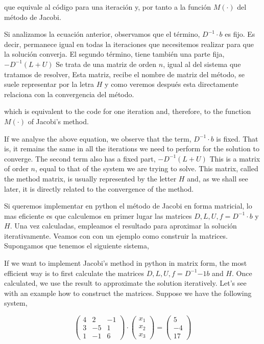 \begin{paracol}{2}
que equivale al código para una iteración y, por tanto a la función $M(\cdot)$ del método de Jacobi. 

Si analizamos la ecuación anterior, observamos que el término, $D^{-1}\cdot b$ es fijo. Es decir, permanece igual en todas la iteraciones que necesitemos realizar para que la solución converja. El segundo término, tiene también una parte fija, $-D^{-1}(L+U)$ Se trata de una matriz de orden $n$, igual al del sistema que tratamos de resolver, Esta matriz, recibe el nombre de matriz del método, se suele representar por la letra $H$ y como veremos después esta directamente relaciona con la convergencia del método.

\switchcolumn
which is equivalent to the code for one iteration and, therefore, to the function $M(\cdot)$ of Jacobi's method. 

If we analyse the above equation, we observe that the term, $D^{-1}\cdot b$ is fixed. That is, it remains the same in all the iterations we need to perform for the solution to converge. The second term also has a fixed part, $-D^{-1}(L+U)$ This is a matrix of order $n$, equal to that of the system we are trying to solve. This matrix, called the method matrix, is usually represented by the letter $H$ and, as we shall see later, it is directly related to the convergence of the method.

\switchcolumn

Si queremos implementar en python el método de Jacobi en forma matricial, lo mas eficiente es que calculemos en primer lugar las matrices $D, L, U, f=D^{-1}\cdot b$ y $H$. Una vez calculadas, empleamos el resultado para aproximar la solución iterativamente. Veamos con con un ejemplo como construir la matrices. Supongamos que tenemos el siguiente sistema,

\switchcolumn

If we want to implement Jacobi's method in python in matrix form, the most efficient way is to first calculate the matrices $D, L, U, f=D^{-1}{-1} b$ and $H$. Once calculated, we use the result to approximate the solution iteratively. Let's see with an example how to construct the matrices. Suppose we have the following system,

\end{paracol}

\begin{equation*}
\begin{pmatrix}
4& 2& -1\\
3& -5& 1\\
1& -1& 6
\end{pmatrix}\cdot \begin{pmatrix}
x_1\\
x_2\\
x_3
\end{pmatrix}=\begin{pmatrix}
5\\
-4\\
17
\end{pmatrix}
\end{equation*}

